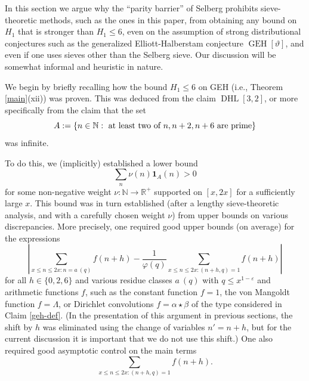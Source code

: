 \documentclass{bmcart}
\DeclareMathOperator*\GEH{GEH}
\DeclareMathOperator*\DHL{DHL}
\theoremstyle{plain}
\theoremstyle{definition}
\newcommand\R{\mathbb{R}}
\newcommand\N{\mathbb{N}}
\newcommand\eps{\varepsilon}
\renewcommand{\phi}{\varphi}
\newcommand{\onef}{\mathbf{1}}
\begin{document}
In this section we argue why the ``parity barrier'' of Selberg \cite{selberg} prohibits sieve-theoretic methods, such as the ones in this paper, from obtaining any bound on $H_1$ that is stronger than $H_1 \leq 6$, even on the assumption of strong distributional conjectures such as the generalized Elliott-Halberstam conjecture $\GEH[\vartheta]$, and even if one uses sieves other than the Selberg sieve.  Our discussion will be somewhat informal and heuristic in nature.

We begin by briefly recalling how the bound $H_1 \leq 6$ on GEH (i.e., Theorem \ref{main}(xii)) was proven.  This was deduced from the claim $\DHL[3,2]$, or more specifically from the claim that the set
\begin{equation}\label{A-def}
A := \{ n \in \N: \hbox{ at least two of } n, n+2, n+6 \hbox{ are prime} \}
\end{equation}
was infinite.

To do this, we (implicitly) established a lower bound
$$ \sum_n \nu(n) \onef_A(n) > 0$$
for some non-negative weight $\nu: \N \to \R^+$ supported on $[x,2x]$ for a sufficiently large $x$.  This bound was in turn established (after a lengthy sieve-theoretic analysis, and with a carefully chosen weight $\nu$) from upper bounds on various discrepancies.  More precisely, one required good upper bounds (on average) for the expressions
\begin{equation}\label{flip}
 \left|\sum_{x \leq n \leq 2x: n = a\ (q)} f(n+h) - \frac{1}{\phi(q)} \sum_{x \leq n \leq 2x: (n+h,q)=1} f(n+h)\right|
\end{equation}
for all $h \in \{0,2,6\}$ and various residue classes $a\ (q)$ with $q \leq x^{1-\eps}$ and arithmetic functions $f$, such as the constant function $f=1$, the von Mangoldt function $f = \Lambda$, or Dirichlet convolutions $f = \alpha \star \beta$ of the type considered in Claim \ref{geh-def}.  (In the presentation of this argument in previous sections, the shift by $h$ was eliminated using the change of variables $n' = n+h$, but for the current discussion it is important that we do not use this shift.)  One also required good asymptotic control on the main terms
\begin{equation}\label{flop}
\sum_{x \leq n \leq 2x: (n+h,q)=1} f(n+h).
\end{equation}
\end{document}
